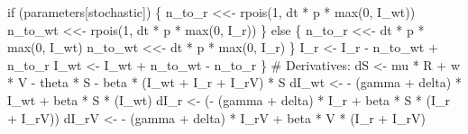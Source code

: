 \documentclass[
  11pt,
  letterpaper,
  DIV=11,
  numbers=noendperiod]{scrartcl}
\newenvironment{Shaded}{\begin{snugshade}}{\end{snugshade}}
\newcommand{\CommentTok}[1]{\textcolor[rgb]{0.37,0.37,0.37}{#1}}
\newcommand{\ControlFlowTok}[1]{\textcolor[rgb]{0.00,0.23,0.31}{#1}}
\newcommand{\DecValTok}[1]{\textcolor[rgb]{0.68,0.00,0.00}{#1}}
\newcommand{\FunctionTok}[1]{\textcolor[rgb]{0.28,0.35,0.67}{#1}}
\newcommand{\NormalTok}[1]{\textcolor[rgb]{0.00,0.23,0.31}{#1}}
\newcommand{\OtherTok}[1]{\textcolor[rgb]{0.00,0.23,0.31}{#1}}
\newcommand{\SpecialCharTok}[1]{\textcolor[rgb]{0.37,0.37,0.37}{#1}}
\newcommand{\StringTok}[1]{\textcolor[rgb]{0.13,0.47,0.30}{#1}}
\begin{document}
\begin{Shaded}
\begin{Highlighting}[]
            \ControlFlowTok{if}\NormalTok{ (parameters[}\StringTok{\textquotesingle{}stochastic\textquotesingle{}}\NormalTok{]) \{}
\NormalTok{            n\_to\_r  }\OtherTok{\textless{}\textless{}{-}} \FunctionTok{rpois}\NormalTok{(}\DecValTok{1}\NormalTok{, dt }\SpecialCharTok{*}\NormalTok{ p }\SpecialCharTok{*} \FunctionTok{max}\NormalTok{(}\DecValTok{0}\NormalTok{, I\_wt))}
\NormalTok{            n\_to\_wt }\OtherTok{\textless{}\textless{}{-}} \FunctionTok{rpois}\NormalTok{(}\DecValTok{1}\NormalTok{, dt }\SpecialCharTok{*}\NormalTok{ p }\SpecialCharTok{*} \FunctionTok{max}\NormalTok{(}\DecValTok{0}\NormalTok{, I\_r))}
\NormalTok{            \} }\ControlFlowTok{else}\NormalTok{ \{}
\NormalTok{                n\_to\_r  }\OtherTok{\textless{}\textless{}{-}}\NormalTok{ dt }\SpecialCharTok{*}\NormalTok{ p }\SpecialCharTok{*} \FunctionTok{max}\NormalTok{(}\DecValTok{0}\NormalTok{, I\_wt)}
\NormalTok{                n\_to\_wt }\OtherTok{\textless{}\textless{}{-}}\NormalTok{ dt }\SpecialCharTok{*}\NormalTok{ p }\SpecialCharTok{*} \FunctionTok{max}\NormalTok{(}\DecValTok{0}\NormalTok{, I\_r)}
\NormalTok{            \}}
\NormalTok{        I\_r  }\OtherTok{\textless{}{-}}\NormalTok{ I\_r  }\SpecialCharTok{{-}}\NormalTok{ n\_to\_wt }\SpecialCharTok{+}\NormalTok{ n\_to\_r}
\NormalTok{        I\_wt }\OtherTok{\textless{}{-}}\NormalTok{ I\_wt }\SpecialCharTok{+}\NormalTok{ n\_to\_wt }\SpecialCharTok{{-}}\NormalTok{ n\_to\_r}
\NormalTok{    \}}
    \CommentTok{\# Derivatives:}
\NormalTok{    dS    }\OtherTok{\textless{}{-}}\NormalTok{ mu }\SpecialCharTok{*}\NormalTok{ R }\SpecialCharTok{+}\NormalTok{ w }\SpecialCharTok{*}\NormalTok{ V }\SpecialCharTok{{-}}\NormalTok{ theta }\SpecialCharTok{*}\NormalTok{ S }\SpecialCharTok{{-}}\NormalTok{ beta }\SpecialCharTok{*}\NormalTok{ (I\_wt }\SpecialCharTok{+}\NormalTok{ I\_r }\SpecialCharTok{+}\NormalTok{ I\_rV) }\SpecialCharTok{*}\NormalTok{ S}
\NormalTok{    dI\_wt }\OtherTok{\textless{}{-}} \SpecialCharTok{{-}}\NormalTok{ (gamma }\SpecialCharTok{+}\NormalTok{ delta) }\SpecialCharTok{*}\NormalTok{ I\_wt }\SpecialCharTok{+}\NormalTok{ beta }\SpecialCharTok{*}\NormalTok{ S }\SpecialCharTok{*}\NormalTok{ (I\_wt)}
\NormalTok{    dI\_r  }\OtherTok{\textless{}{-}}\NormalTok{ (}\SpecialCharTok{{-}}\NormalTok{ (gamma }\SpecialCharTok{+}\NormalTok{ delta) }\SpecialCharTok{*}\NormalTok{ I\_r  }\SpecialCharTok{+}\NormalTok{ beta }\SpecialCharTok{*}\NormalTok{ S }\SpecialCharTok{*}\NormalTok{ (I\_r }\SpecialCharTok{+}\NormalTok{ I\_rV))}
\NormalTok{    dI\_rV }\OtherTok{\textless{}{-}} \SpecialCharTok{{-}}\NormalTok{ (gamma }\SpecialCharTok{+}\NormalTok{ delta) }\SpecialCharTok{*}\NormalTok{ I\_rV }\SpecialCharTok{+}\NormalTok{ beta }\SpecialCharTok{*}\NormalTok{ V }\SpecialCharTok{*}\NormalTok{ (I\_r }\SpecialCharTok{+}\NormalTok{ I\_rV)}

\end{Highlighting}
\end{Shaded}
\end{document}
